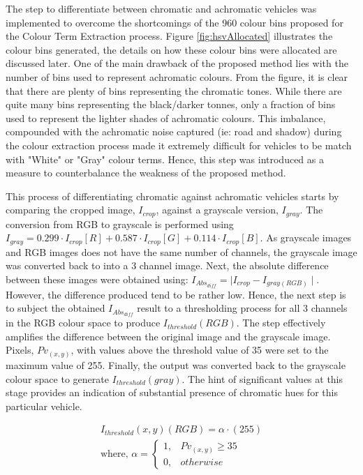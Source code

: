 The step to differentiate between chromatic and achromatic vehicles was implemented to overcome the shortcomings of the 960 colour bins proposed for the Colour Term Extraction process. Figure \ref{fig:hsvAllocated} illustrates the colour bins generated, the details on how these colour bins were allocated are discussed later.
One of the main drawback of the proposed method lies with the number of bins used to represent achromatic colours.
From the figure, it is clear that there are plenty of bins representing the chromatic tones.
While there are quite many bins representing the black/darker tonnes, only a fraction of bins used to represent the lighter shades of achromatic colours.
This imbalance, compounded with the achromatic noise captured (ie: road and shadow) during the colour extraction process made it extremely difficult for vehicles to be match with "White" or "Gray" colour terms. Hence, this step was introduced as a measure to counterbalance the weakness of the proposed method.


This process of differentiating chromatic against achromatic vehicles starts by comparing the cropped image, $I_{crop}$, against a grayscale version, $I_{gray}$.
The conversion from RGB to grayscale is performed using $I_{gray} = 0.299 \cdot I_{crop}[R]+0.587 \cdot I_{crop}[G]+0.114 \cdot I_{crop}[B]$.
As grayscale images and RGB images does not have the same number of channels, the grayscale image was converted back to into a 3 channel image.
Next, the absolute difference between these images were obtained using: $I_{Abs_{diff}} = \mid I_{crop} - I_{gray(RGB)} \mid$.
However, the difference produced tend to be rather low.
Hence, the next step is to subject the obtained $I_{Abs_{diff}}$ result to a thresholding process for all 3 channels in the RGB colour space to produce $I_{threshold}(RGB)$.
The step effectively amplifies the difference between the original image and the grayscale image. Pixels, $Pv_{(x,y)}$, with values above the threshold value of 35 were set to the maximum value of 255.
Finally, the output %
was converted back to the grayscale colour space to generate $I_{threshold}(gray)$. The hint of significant values at this stage provides an indication of substantial presence of chromatic hues for this particular vehicle.

\begin{align*}
\label{eq:threshabsolutediff}
I_{threshold}(x,y)(RGB) = \alpha \cdot (255) \\
\text{where, }
\alpha =
\begin{cases}
1, & Pv_{(x,y)} \geq 35\\
0, & otherwise
\end{cases}
\end{align*}




